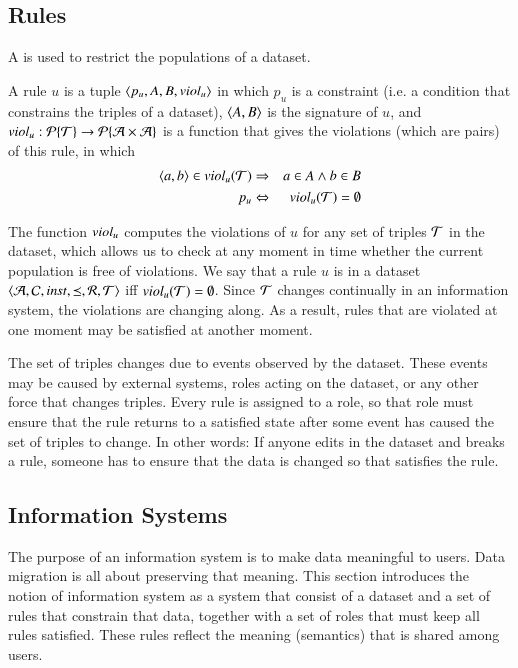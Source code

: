 \documentclass{elsarticle}
\begin{document}
\subsection{Rules}
\label{sct:Rules}
	A  is used to restrict the populations of a dataset.
\begin{definition}[rule]
	\label{def:rule}
	\item A rule $u$ is a tuple $\langle p_u,A,B,\text{\it viol\/}_u\rangle$
	in which $p_u$ is a constraint (i.e. a condition that constrains the triples of a dataset),
	$\langle{A},{B}\rangle$ is the signature of $u$, and
	$\text{\it viol\/}_u:\cal{P}\{\mathcal{T}\}\rightarrow\cal{P}\{\mathcal{A}\times\mathcal{A}\}$ is a function that gives the violations (which are pairs) of this rule,
	in which
\begin{eqnarray}
	\langle{a},{b}\rangle\in\text{\it viol\/}_{u}(\mathcal{T})&\Rightarrow&a\in A\wedge b\in B\\
	p_u&\Leftrightarrow&\text{\it viol\/}_{u}(\mathcal{T})=\emptyset
\end{eqnarray}
\end{definition}
	The function $\text{\it viol\/}_u$ computes the violations of $u$ for any set of triples $\mathcal{T}$ in the dataset,
	which allows us to check at any moment in time whether the current population is free of violations.
	We say that a rule $u$ is  in a dataset $\langle\mathcal{A},\mathcal{C},\text{\it inst\/},\preceq,\mathcal{R},\mathcal{T}\rangle$ iff $\text{\it viol\/}_{u}(\mathcal{T})=\emptyset$.
	Since $\mathcal{T}$ changes continually in an information system, the violations are changing along.
	As a result, rules that are violated at one moment may be satisfied at another moment.

	The set of triples changes due to events observed by the dataset.
	These events may be caused by external systems, roles acting on the dataset, or any other force that changes triples.
	Every rule is assigned to a role, so that role must ensure that the rule returns to a satisfied state after some event has caused the set of triples to change.
	In other words: If anyone edits in the dataset and breaks a rule, someone has to ensure that the data is changed so that satisfies the rule.

\subsection{Information Systems}
\label{sct:Information Systems}
	The purpose of an information system is to make data meaningful to users.
	Data migration is all about preserving that meaning.
	This section introduces the notion of information system
	as a system that consist of a dataset and a set of rules that constrain that data,
	together with a set of roles that must keep all rules satisfied.
	These rules reflect the meaning (semantics) that is shared among users.
\end{document}

